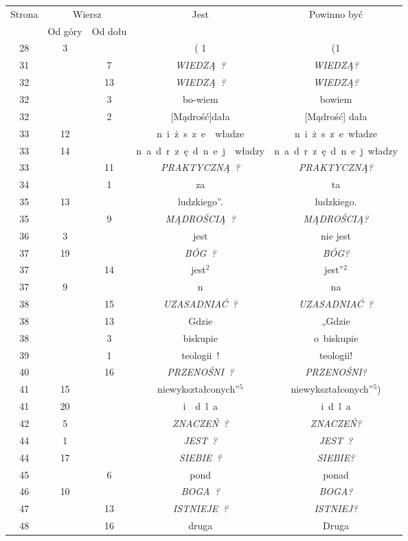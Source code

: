 \documentclass[a4paper,11pt]{article}
\begin{document}
\begin{center}

  \begin{tabular}{|c|c|c|c|c|}
    \hline
    Strona & \multicolumn{2}{c|}{Wiersz} & Jest
                              & Powinno być \\ \cline{2-3}
    & Od góry & Od dołu & & \\
    \hline
    28 & \hphantom{0}3 & & ( 1 & (1 \\
    31 & & \hphantom{0}7 & \textit{WIEDZĄ~?} & \textit{WIEDZĄ?} \\
    32 & & 13 & \textit{WIEDZĄ~?} & \textit{WIEDZĄ?} \\
    32 & & \hphantom{0}3 & bo-wiem & bowiem \\
    32 & & \hphantom{0}2 & [Mądrość]dała & [Mądrość] dała \\
    33 & 12 & & n~i~ż~s~z~e~~władze & n~i~ż~s~z~e\, władze \\
    33 & 14 & & n~a~d~r~z~ę~d~n~e~j~~władzy
           & n~a~d~r~z~ę~d~n~e~j\, władzy \\
    33 & & 11 & \textit{PRAKTYCZNĄ~?} & \textit{PRAKTYCZNĄ?} \\
    34 & & \hphantom{0}1 & za & ta \\
    35 & 13 & & ludzkiego”. & ludzkiego. \\
    35 & & \hphantom{0}9 & \textit{MĄDROŚCIĄ~?} & \textit{MĄDROŚCIĄ?} \\
    36 & \hphantom{0}3 & & jest & nie jest \\
    37 & 19 & & \textit{BÓG~?} & \textit{BÓG?} \\
    37 & & 14 & jest$^{ 2 }$ & jest''$^{ 2 }$ \\
    37 & \hphantom{0}9 & & n & na \\
    38 & & 15 & \textit{UZASADNIAĆ~?} & \textit{UZASADNIAĆ~?} \\
    38 & & 13 & Gdzie & „Gdzie \\
    38 & & \hphantom{0}3 & biskupie & o~biskupie \\
    39 & & \hphantom{0}1 & teologii~! & teologii! \\
    40 & & 16 & \textit{PRZENOŚNI~?} & \textit{PRZENOŚNI?} \\
    41 & 15 & & niewykształconych”$^{ 5 }$
           & niewykształconych”$^{ 5 }$) \\
    41 & 20 & & i~~d~l~a & i{}\, d~l~a \\
    42 & \hphantom{0}5 & & \textit{ZNACZEŃ~?} & \textit{ZNACZEŃ?} \\
    44 & \hphantom{0}1 & & \textit{JEST~?} & \textit{JEST~?} \\
    44 & 17 & & \textit{SIEBIE~?} & \textit{SIEBIE?} \\
    45 & & \hphantom{0}6 & pond & ponad \\
    46 & 10 & & \textit{BOGA~?} & \textit{BOGA?} \\
    47 & & 13 & \textit{ISTNIEJE~?} & \textit{ISTNIEJ?} \\
    48 & & 16 & druga & Druga \\
    \hline
  \end{tabular}






\end{center}
\end{document}
